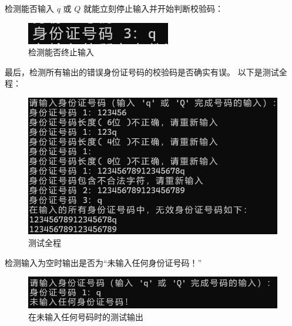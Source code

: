 \documentclass[withoutpreface,bwprint]{cumcmthesis}  %
\begin{document}
		\newpage
		检测能否输入 $q$ 或 $Q$ 就能立刻停止输入并开始判断校验码：
		
		\begin{figure}[ht]
			\centering
			\includegraphics[width=.3\textwidth]{退出.png}
			\caption{检测能否终止输入}
		\end{figure}
		
		最后，检测所有输出的错误身份证号码的校验码是否确实有误。
		以下是测试全程：
		
		\begin{figure}[ht]
			\centering
			\includegraphics[width=.8\textwidth]{测试全程.png}
			\caption{测试全程}
		\end{figure}
		
		检测输入为空时输出是否为“未输入任何身份证号码！”
		\begin{figure}[ht]
			\centering
			\includegraphics[width=.8\textwidth]{无号码.png}
			\caption{在未输入任何号码时的测试输出}
		\end{figure}
		
\end{document}
